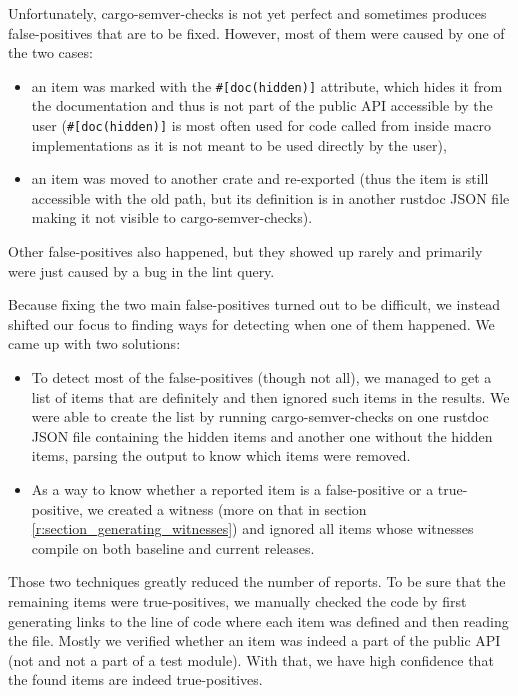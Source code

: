 \documentclass[licencjacka,en]{pracamgr}
\begin{document}
Unfortunately, cargo-semver-checks is not yet perfect and sometimes produces false-positives
that are to be fixed. However, most of them were caused by one of the two cases:
\begin{itemize}
	\item an item was marked with the \texttt{\#[doc(hidden)]} attribute,
		which hides it from the documentation and thus is not part
		of the public API accessible by the user
		(\texttt{\#[doc(hidden)]} is most often used for code called from inside macro implementations
		as it is not meant to be used directly by the user),
	\item an item was moved to another crate and re-exported
		(thus the item is still accessible with the old path,
		but its definition is in another rustdoc JSON file making it not visible to cargo-semver-checks).
\end{itemize}
Other false-positives also happened, but they showed up rarely and primarily
were just caused by a bug in the lint query.

Because fixing the two main false-positives turned out to be difficult, we instead shifted our focus
to finding ways for detecting when one of them happened.
We came up with two solutions:
\begin{itemize}
	\item To detect most of the  false-positives
		(though not all), we managed to get a list of items that are definitely
		 and then ignored such items in the results.
		We were able to create the list by running cargo-semver-checks on one rustdoc JSON file
		containing the hidden items and another one without the hidden items,
		parsing the output to know which items were removed.
	\item As a way to know whether a reported item is a false-positive or a true-positive,
		we created a witness (more on that in section \ref{r:section_generating_witnesses})
		and ignored all items whose witnesses compile on both baseline and current releases.
\end{itemize}

Those two techniques greatly reduced the number of reports.
To be sure that the remaining items were true-positives,
we manually checked the code by first generating links to the line of code where each item was defined
and then reading the file.
Mostly we verified whether an item was indeed a part of the public API
(not  and not a part of a test module).
With that, we have high confidence that the found items are indeed true-positives.
\end{document}
